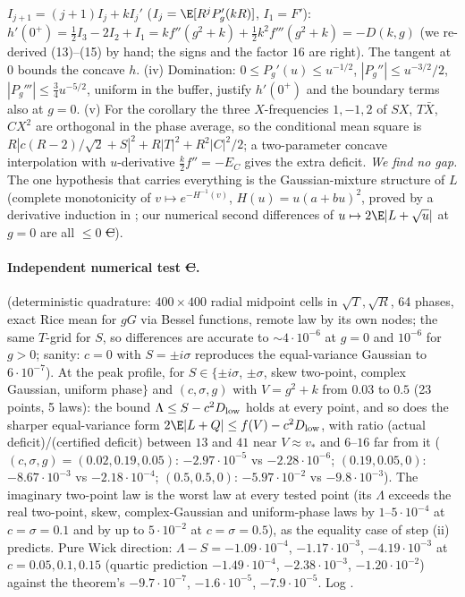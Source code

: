 $I_{j+1}=(j+1)I_j+kI_j'$ ($I_j=\E[R^jP_g'(kR)]$, $I_1=F'$): $h'(0^+)=\frac12I_3-2I_2+I_1=kf''(g^2+k)+\frac12k^2f'''(g^2+k)=-D(k,g)$ (we re-derived (13)--(15) by hand; the signs and
the factor $16$ are right). The tangent at $0$ bounds the concave $h$. (iv) Domination: $0\le P_g'(u)\le u^{-1/2}$, $|P_g''|\le u^{-3/2}/2$, $|P_g'''|\le\frac34u^{-5/2}$, uniform in the
buffer, justify $h'(0^+)$ and the boundary terms also at $g=0$. (v) For the corollary the three $X$-frequencies $1,-1,2$ of $SX$, $T\bar X$, $CX^2$ are orthogonal in the phase average, so
the conditional mean square is $R|c(R-2)/\sqrt2+S|^2+R|T|^2+R^2|C|^2/2$; a two-parameter concave interpolation with $u$-derivative $\frac k2f''=-E_C$ gives the extra deficit. \emph{We find
no gap.} The one hypothesis that carries everything is the Gaussian-mixture structure of $L$ (complete monotonicity of $v\mapsto e^{-H^{-1}(v)}$, $H(u)=u(a+bu)^2$, proved by a
derivative induction in ; our numerical second differences of $u\mapsto2\E|L+\sqrt u|$ at $g=0$ are all $\le0$ \st{C}).

\paragraph{Independent numerical test \st{C}.}  (deterministic quadrature: $400\times400$ radial midpoint cells in $\sqrt T,\sqrt R$, 64
phases, exact Rice mean for $gG$ via  Bessel functions, remote law by its own nodes; the same $T$-grid for $S$, so differences are accurate to $\sim4\cdot10^{-6}$ at $g=0$ and
$10^{-6}$ for $g>0$; sanity: $c=0$ with $S=\pm i\sigma$ reproduces the equal-variance Gaussian to $6\cdot10^{-7}$). At the peak profile, for $S\in\{\pm i\sigma$, $\pm\sigma$, skew two-point,
complex Gaussian, uniform phase$\}$ and $(c,\sigma,g)$ with $V=g^2+k$ from $0.03$ to $0.5$ (23 points, 5 laws): the bound $\Lambda\le S-c^2D_{\rm low}$ holds at every point, and so does the sharper
equal-variance form $2\E|L+Q|\le f(V)-c^2D_{\rm low}$, with ratio (actual deficit)/(certified deficit) between $13$ and $41$ near $V\approx v_*$ and $6$--$16$ far from it
($(c,\sigma,g)=(0.02,0.19,0.05)$: $-2.97\cdot10^{-5}$ vs $-2.28\cdot10^{-6}$; $(0.19,0.05,0)$: $-8.67\cdot10^{-3}$ vs $-2.18\cdot10^{-4}$; $(0.5,0.5,0)$: $-5.97\cdot10^{-2}$ vs
$-9.8\cdot10^{-3}$). The imaginary two-point law is the worst law at every tested point (its $\Lambda$ exceeds the real two-point, skew, complex-Gaussian and uniform-phase laws by
$1$--$5\cdot10^{-4}$ at $c=\sigma=0.1$ and by up to $5\cdot10^{-2}$ at $c=\sigma=0.5$), as the equality case of step (ii) predicts. Pure Wick direction: $\Lambda-S=-1.09\cdot10^{-4}$, $-1.17\cdot10^{-3}$,
$-4.19\cdot10^{-3}$ at $c=0.05,0.1,0.15$ (quartic prediction $-1.49\cdot10^{-4}$, $-2.38\cdot10^{-3}$, $-1.20\cdot10^{-2}$) against the theorem's $-9.7\cdot10^{-7}$, $-1.6\cdot10^{-5}$, $-7.9\cdot10^{-5}$.
Log .

